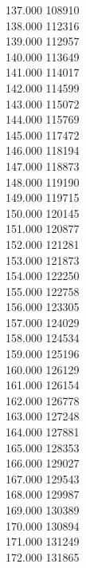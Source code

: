 { 137.000	108910 \\
 138.000	112316 \\
 139.000	112957 \\
 140.000	113649 \\
 141.000	114017 \\
 142.000	114599 \\
 143.000	115072 \\
 144.000	115769 \\
 145.000	117472 \\
 146.000	118194 \\
 147.000	118873 \\
 148.000	119190 \\
 149.000	119715 \\
 150.000	120145 \\
 151.000	120877 \\
 152.000	121281 \\
 153.000	121873 \\
 154.000	122250 \\
 155.000	122758 \\
 156.000	123305 \\
 157.000	124029 \\
 158.000	124534 \\
 159.000	125196 \\
 160.000	126129 \\
 161.000	126154 \\
 162.000	126778 \\
 163.000	127248 \\
 164.000	127881 \\
 165.000	128353 \\
 166.000	129027 \\
 167.000	129543 \\
 168.000	129987 \\
 169.000	130389 \\
 170.000	130894 \\
 171.000	131249 \\
 172.000	131865 \\
}
